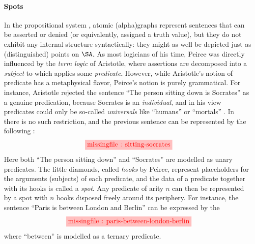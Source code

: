 \begin{scope}
\paragraph{Spots} In the propositional system , atomic
\kl(alpha){graphs} represent sentences that can be asserted or denied (or
equivalently, assigned a truth value), but they do not exhibit any internal
structure syntactically: they might as well be depicted just as (distinguished)
points on $\SA$. As most logicians of his time, Peirce was directly influenced
by the \emph{term logic} of Aristotle, where assertions are decomposed into a
\emph{subject} to which applies some \emph{predicate}. However, while
Aristotle's notion of predicate has a metaphysical flavor, Peirce's notion is
purely grammatical. For instance, Aristotle rejected the sentence ``The person
sitting down is Socrates'' as a genuine predication, because Socrates is an
\emph{individual}, and in his view predicates could only be so-called
\emph{universals} like ``humans'' or ``mortals''
. In  there is no such restriction, and
the previous sentence can be represented by the following :
\begin{equation}
  \tikzfig{1}{0.5}{sitting-socrates} \label{eq:sitting-socrates}
\end{equation}
Here both ``The person sitting down'' and ``Socrates'' are modelled as unary
predicates. The little diamonds, called \emph{hooks} by Peirce, represent
placeholders for the arguments (subjects) of each predicate, and the data of a
predicate together with its hooks is called a \emph{spot}. Any predicate of arity $n$ can then be represented by a spot with
$n$ hooks disposed freely around its periphery. For instance, the sentence
``Paris is between London and Berlin'' can be expressed by the 
\begin{equation*}
  \tikzfig{1}{0.5}{paris-between-london-berlin} \label{eq:paris-between-london-berlin}
\end{equation*}
where ``between'' is modelled as a ternary predicate.


\end{scope}
